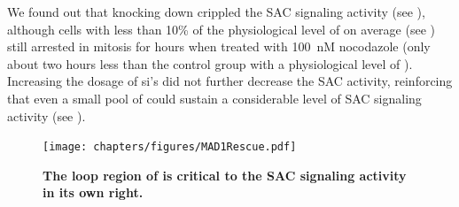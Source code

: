 We found out that knocking down  crippled the SAC signaling activity (see ), although cells with less than 10\% of the physiological level of  on average (see ) still arrested in mitosis for hours when treated with \SI{100}{nM} nocodazole (only about two hours less than the control group with a physiological level of ). Increasing the dosage of si's did not further decrease the SAC activity, reinforcing that even a small pool of  could sustain a considerable level of SAC signaling activity (see ).

\begin{figure}
    \centering
    \texttt{[image: chapters/figures/MAD1Rescue.pdf]}
    \caption{\textbf{The loop region of  is critical to the SAC signaling activity in its own right.}}
    \label{MAD1Rescue}
\end{figure}
